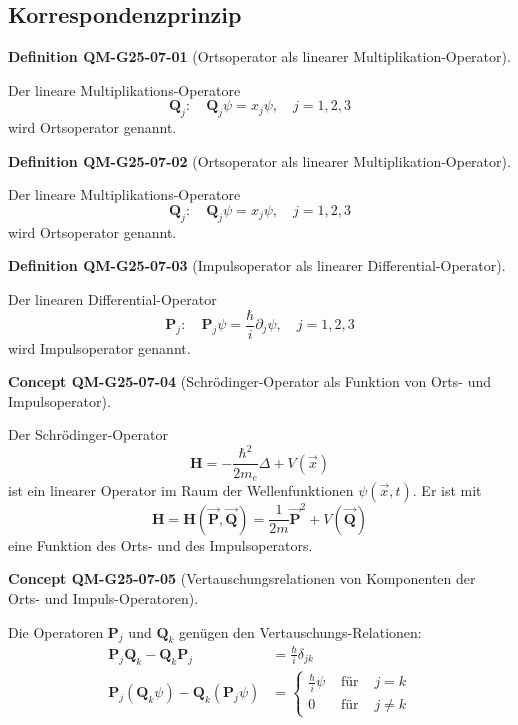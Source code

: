 \documentclass[10pt, letterpaper]{article}
\newcommand{\CustomHeading}[3]{%
  \par\medskip\noindent%
  \textbf{#1 #2} \textnormal{(#3)}.\enskip%
}
\newenvironment{DEF}[2]{\CustomHeading{Definition}{#1}{#2}}{}
\newenvironment{CONC}[2]{\CustomHeading{Concept}{#1}{#2}}{}
\begin{document}
\subsection{Korrespondenzprinzip}

\begin{DEF}{QM-G25-07-01}{Ortsoperator als linearer Multiplikation-Operator}
Der lineare Multiplikations-Operatore
$$
\mathbf{Q}_{j}: \quad \mathbf{Q}_{j} \psi=x_{j} \psi, \quad j=1,2,3
$$
wird Ortsoperator genannt.
\end{DEF}

\begin{DEF}{QM-G25-07-02}{Ortsoperator als linearer Multiplikation-Operator}
Der lineare Multiplikations-Operatore
$$
\mathbf{Q}_{j}: \quad \mathbf{Q}_{j} \psi=x_{j} \psi, \quad j=1,2,3
$$
wird Ortsoperator genannt.
\end{DEF}

\begin{DEF}{QM-G25-07-03}{Impulsoperator als linearer Differential-Operator}
Der linearen Differential-Operator
$$
\mathbf{P}_{j}: \quad \mathbf{P}_{j} \psi=\frac{\hbar}{i} \partial_{j} \psi, \quad j=1,2,3
$$
wird Impulsoperator genannt.
\end{DEF}

\begin{CONC}{QM-G25-07-04}{Schrödinger-Operator als Funktion von Orts- und Impulsoperator}
Der Schrödinger-Operator
$$
\mathbf{H}=-\frac{\hbar^{2}}{2 m_{e}} \Delta+V(\vec{x})
$$
ist ein linearer Operator im Raum der Wellenfunktionen $\psi(\vec{x}, t)$. Er ist mit
$$
\mathbf{H}=\mathbf{H}(\overrightarrow{\mathbf{P}}, \overrightarrow{\mathbf{Q}})=\frac{1}{2 m} \overrightarrow{\mathbf{P}}^{2}+V(\overrightarrow{\mathbf{Q}})
$$
eine Funktion des Orts- und des Impulsoperators.
\end{CONC}

\begin{CONC}{QM-G25-07-05}{Vertauschungsrelationen von Komponenten der Orts- und Impuls-Operatoren}
Die Operatoren $\mathbf{P}_{j}$ und $\mathbf{Q}_{k}$ genügen den Vertauschungs-Relationen:
$$
\begin{aligned}
\mathbf{P}_{j} \mathbf{Q}_{k}-\mathbf{Q}_{k} \mathbf{P}_{j} & =\frac{\hbar}{i} \delta_{j k} \\
\mathbf{P}_{j}\left(\mathbf{Q}_{k} \psi\right)-\mathbf{Q}_{k}\left(\mathbf{P}_{j} \psi\right) & =\left\{\begin{array}{rll}
\frac{\hbar}{i} \psi & \text { für } & j=k \\
0 & \text { für } & j \neq k
\end{array}\right.
\end{aligned}
$$
\end{CONC}
\end{document}
